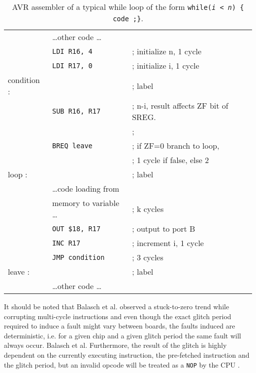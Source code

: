 \begin{table}
\caption{\footnotesize AVR assembler of  a typical while loop of the form \texttt{while(\emph{i < n}) \{ code ;\}}.}
\label{tab:while}
\center
\begin{tabular}{ l l p{3cm} }
& \dots other code \dots & \\
&\texttt{LDI R16, 4 }& ; initialize n, 1 cycle\\
&\texttt{LDI R17, 0 }& ; initialize i, 1 cycle \\
condition : &&  ; label\\
& \texttt{SUB R16, R17 }& ; n-i, result affects ZF bit of SREG.\\
& & ; \\
& \texttt{BREQ leave} & ; if ZF=0 branch to loop,\\
& &  ; 1 cycle if false, else 2\\
loop :  & & ; label\\
& \dots code loading from  &\\
& memory to variable \dots & ; k cycles\\
& \texttt{OUT \$18, R17} & ; output to port B\\
& \texttt{INC R17 }& ; increment i, 1 cycle \\
& \texttt{JMP condition }& ; 3 cycles \\
leave : && ; label \\
& \dots other code \dots & \\
\end{tabular}
\end{table}

It should be noted that Balasch et al. \citep{glitches_paper} observed a stuck-to-zero trend while corrupting multi-cycle instructions and even though the exact glitch period required to induce a fault might vary between boards, the faults  induced are deterministic, i.e. for a given chip and a given glitch period the same fault will always occur. Balasch et al. Furthermore, the result of the glitch is highly dependent on the currently executing instruction, the pre-fetched instruction and the glitch period, but an invalid opcode will be treated as a \texttt{NOP}  by the CPU \citep{glitches_paper}.